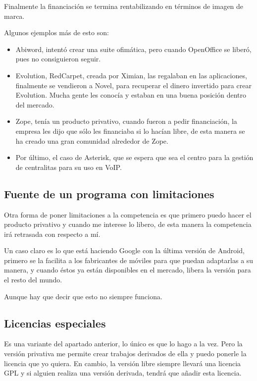 Finalmente la financiación se termina rentabilizando en términos de imagen de
marca.

Algunos ejemplos más de esto son:
\begin{itemize}
 \item Abiword, intentó crear una suite ofimática, pero cuando OpenOffice se liberó,
pues no consiguieron seguir.
\item Evolution, RedCarpet, creada por Ximian, las regalaban en las
aplicaciones, finalmente se vendieron a Novel, para recuperar el dinero
invertido para crear Evolution. Mucha gente les conocía y estaban en una buena
posición dentro del mercado.
\item Zope, tenía un producto privativo, cuando fueron a pedir financiación, la
empresa les dijo que sólo les financiaba si lo hacían libre, de esta manera se
ha creado una gran comunidad alrededor de Zope.
\item Por último, el caso de Asterisk, que se espera que sea el centro para la
gestión de centralitas para su uso en VoIP.
\end{itemize}



\subsection{Fuente de un programa con limitaciones}

Otra forma de poner limitaciones a la competencia es que primero puedo hacer el
producto privativo y cuando me interese lo libero, de esta manera la competencia
irá retrasada con respecto a mí.

Un caso claro es lo que está haciendo Google con la última versión de Android,
primero se la facilita a los fabricantes de móviles para que puedan adaptarlas a
su manera, y cuando éstos ya están disponibles en el mercado, libera la versión
para el resto del mundo.

Aunque hay que decir que esto no siempre funciona.

\subsection{Licencias especiales}
Es una variante del apartado anterior, lo único es que lo hago a la vez.
Pero la versión privativa me permite crear trabajos
derivados de ella y puedo ponerle la licencia que yo quiera. En cambio, la
versión libre siempre llevará una licencia GPL y si alguien realiza una versión
derivada, tendrá que añadir esta licencia.

